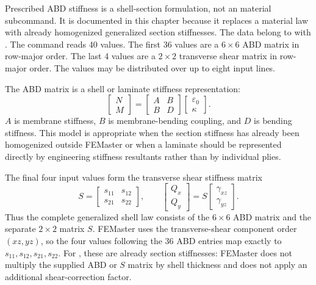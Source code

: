 Prescribed ABD stiffness is a shell-section formulation, not an  material subcommand. It is documented in this chapter because it replaces a material law with already homogenized generalized section stiffnesses. The data belong to  with . The command reads 40 values. The first 36 values are a \(6\times6\) ABD matrix in row-major order. The last 4 values are a \(2\times2\) transverse shear matrix in row-major order. The values may be distributed over up to eight input lines.

The ABD matrix is a shell or laminate stiffness representation:
\[
\begin{bmatrix}
N\\
M
\end{bmatrix}
=
\begin{bmatrix}
A & B\\
B & D
\end{bmatrix}
\begin{bmatrix}
\varepsilon_0\\
\kappa
\end{bmatrix}.
\]
\(A\) is membrane stiffness, \(B\) is membrane-bending coupling, and \(D\) is bending stiffness. This model is appropriate when the section stiffness has already been homogenized outside FEMaster or when a laminate should be represented directly by engineering stiffness resultants rather than by individual plies.

The final four input values form the transverse shear stiffness matrix
\[
S =
\begin{bmatrix}
s_{11} & s_{12}\\
s_{21} & s_{22}
\end{bmatrix},
\qquad
\begin{bmatrix}
Q_x\\
Q_y
\end{bmatrix}
=
S
\begin{bmatrix}
\gamma_{xz}\\
\gamma_{yz}
\end{bmatrix}.
\]
Thus the complete generalized shell law consists of the \(6\times6\) ABD matrix and the separate \(2\times2\) matrix \(S\). FEMaster uses the transverse-shear component order \((xz,yz)\), so the four values following the 36 ABD entries map exactly to \(s_{11},s_{12},s_{21},s_{22}\). For , these are already section stiffnesses: FEMaster does not multiply the supplied ABD or \(S\) matrix by shell thickness and does not apply an additional shear-correction factor.


